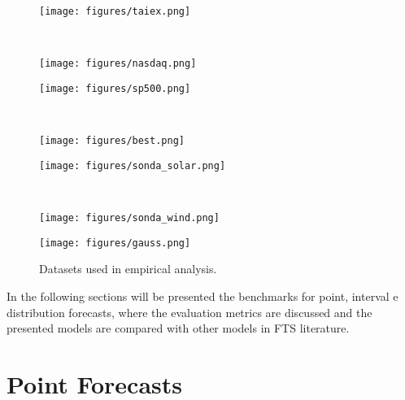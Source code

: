 \begin{figure}
\begin{subfloat}[TAIEX]{
\texttt{[image: figures/taiex.png]}
\label{fig:taiex}}
\end{subfloat}
~
\begin{subfloat}[NASDAQ]{
\texttt{[image: figures/nasdaq.png]}
\label{fig:nasdaq}}
\end{subfloat}

\begin{subfloat}[S\&P 500]{
\texttt{[image: figures/sp500.png]}
\label{fig:sp500}}
\end{subfloat}
~
\begin{subfloat}[BEST]{
\texttt{[image: figures/best.png]}
\label{fig:best}}
\end{subfloat}

\begin{subfloat}{
\texttt{[image: figures/sonda\_solar.png]}
\label{fig:sonda_solar}}
\end{subfloat}
~
\begin{subfloat}{
\texttt{[image: figures/sonda\_wind.png]}
\label{fig:sonda_wind}}
\end{subfloat}

\begin{subfloat}{
\texttt{[image: figures/gauss.png]}
\label{fig:gauss}}
\end{subfloat}

\caption{Datasets used in empirical analysis.}
\end{figure}

 In the following sections will be presented the benchmarks for point, interval e distribution forecasts, where the evaluation metrics are discussed and the presented models are compared with other models in FTS literature.


\section{Point Forecasts}


